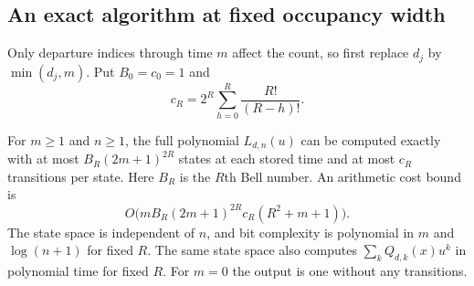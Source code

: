 \documentclass[11pt,a4paper]{article}
\begin{document}
\subsection{An exact algorithm at fixed occupancy width}

Only departure indices through time $m$ affect the count, so first
replace $d_j$ by $\min(d_j,m)$. Put $B_0=c_0=1$ and
\[
 c_R=2^R\sum_{h=0}^R\frac{R!}{(R-h)!}.
\]

\begin{proposition}\label{prop:algorithm}
For $m\ge1$ and $n\ge1$, the full polynomial $L_{d,n}(u)$ can be
computed exactly with at most $B_R(2m+1)^{2R}$ states at each stored
time and at most $c_R$ transitions per state. Here $B_R$ is the $R$th
Bell number. An arithmetic cost bound is
\[
 O\bigl(mB_R(2m+1)^{2R}c_R(R^2+m+1)\bigr).
\]
The state space is independent of $n$, and bit complexity is
polynomial in $m$ and $\log(n+1)$ for fixed $R$. The same state space
also computes $\sum_kQ_{d,k}(x)u^k$ in polynomial time for fixed $R$.
For $m=0$ the output is one without any transitions.
\end{proposition}
\end{document}
